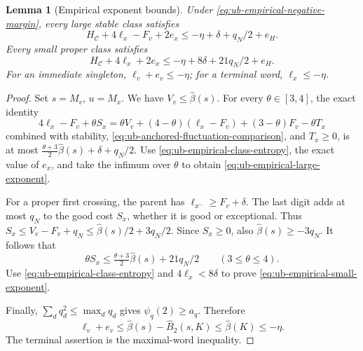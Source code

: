 \documentclass[11pt]{article}
\numberwithin{equation}{section}
\newtheorem{lemma}[lemma]{Lemma}
\newcommand{\1}{\mathbf 1}
\begin{document}
\begin{lemma}[Empirical exponent bounds]
\label{lem:ub-numerical-lemma}
Under \eqref{eq:ub-empirical-negative-margin}, every large stable
class satisfies
\begin{equation}
\label{eq:ub-empirical-large-exponent}
 H_{\mathcal C}+4\ell_x-F_v+2e_x
 \le-\eta+\delta+q_N/2+e_H.
\end{equation}
Every small proper class satisfies
\begin{equation}
\label{eq:ub-empirical-small-exponent}
 H_{\mathcal C}+4\ell_x+2e_x
 \le-\eta+8\delta+21q_N/2+e_H.
\end{equation}
For an immediate singleton, $\ell_v+e_v\le-\eta$;
for a terminal word, $\ell_x\le-\eta$.
\end{lemma}

\begin{proof}
Set $s=M_v$, $u=M_x$. We have $V_v\le\widehat\beta(s)$.
For every $\theta\in[3,4]$, the exact identity
\[
 4\ell_x-F_v+\theta S_x
 =\theta V_v+(4-\theta)(\ell_x-F_v)
                  +(3-\theta)F_v-\theta T_x
\]
combined with stability, \eqref{eq:ub-anchored-fluctuation-comparison},
and $T_x\ge0$, is at most
$\frac{\theta+3}{2}\widehat\beta(s)+\delta+q_N/2$.
Use \eqref{eq:ub-empirical-class-entropy}, the exact value of $e_x$,
and take the infimum over $\theta$ to obtain
\eqref{eq:ub-empirical-large-exponent}.

For a proper first crossing, the parent has
$\ell_{x^-}\ge F_v+\delta$. The last digit adds at most
$q_N$ to the good cost $S_x$, whether it is good or exceptional.
Thus $S_x\le V_v-F_v+q_N\le\widehat\beta(s)/2+3q_N/2$.
Since $S_x\ge0$, also $\widehat\beta(s)\ge-3q_N$.
It follows that
\[
 \theta S_x
 \le\tfrac{\theta+3}{2}\widehat\beta(s)+21q_N/2
 \qquad(3\le\theta\le4).
\]
Use \eqref{eq:ub-empirical-class-entropy} and $4\ell_x<8\delta$
to prove \eqref{eq:ub-empirical-small-exponent}.

Finally, $\sum_dq_d^2\le\max_dq_d$ gives $\psi_q(2)\ge a_q$.
Therefore
\[
 \ell_v+e_v\le\widehat\beta(s)-\widehat B_2(s,K)
                   \le\widehat\beta(K)\le-\eta.
\]
The terminal assertion is the maximal-word inequality.
\end{proof}
\end{document}
